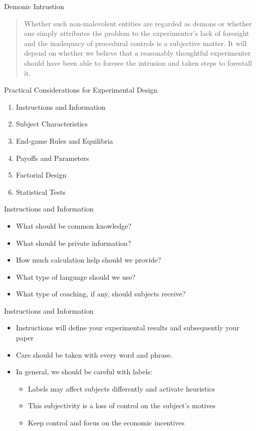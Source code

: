 \documentclass{beamer}
\begin{document}
\begin{frame}{Demonic Intrustion}

\begin{quotation}
Whether such non-malevolent entities are regarded as
demons or whether one simply attributes the problem
to the experimenter's lack of foresight and the inadequacy
of procedural controls is a subjective matter. It
will depend on whether we believe that a reasonably
thoughtful experimenter should have been able to foresee
the intrusion and taken steps to forestall it.
\end{quotation}
\end{frame}

\begin{frame}{Practical Considerations for Experimental Design}
	\begin{enumerate}
		\item Instructions and Information
		\item Subject Characteristics
		\item End-game Rules and Equilibria
		\item Payoffs and Parameters
		\item Factorial Design
		\item Statistical Tests
	\end{enumerate}
\end{frame}

\begin{frame}{Instructions and Information}
	\begin{itemize}
		\item What should be common knowledge?
		\item What should be private information?
		\item How much calculation help should we provide?
		\item What type of language should we use?
		\item What type of coaching, if any, should subjects receive?
	\end{itemize}
\end{frame}

\begin{frame}{Instructions and Information}
	\begin{itemize}
		\item Instructions will define your experimental results and subsequently your paper
		\item Care should be taken with every word and phrase.
		\item In general, we should be careful with labels:
			\begin{itemize}
				\item Labels may affect subjects differently and activate heuristics
				\item This subjectivity is a loss of control on the subject's motives
				\item Keep control and focus on the economic incentives
			\end{itemize}
	\end{itemize}
\end{frame}
\end{document}
